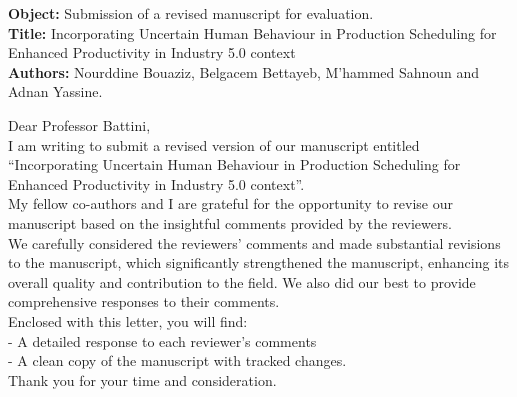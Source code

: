 \documentclass[a4,12pt]{article}
\begin{document}
	\begin{minipage}{\textwidth}
		\textbf{Object:} Submission of a revised manuscript for evaluation.\\
  \textbf{Title:} Incorporating Uncertain Human Behaviour in Production Scheduling for Enhanced Productivity in Industry 5.0 context\\
		\textbf{Authors:} Nourddine  Bouaziz, Belgacem Bettayeb, M'hammed Sahnoun and Adnan Yassine.
		\vspace{10mm} 
		
		Dear Professor Battini,\\
  
	I am writing to submit a revised version of our manuscript entitled “Incorporating Uncertain Human Behaviour in Production Scheduling for Enhanced Productivity in Industry 5.0 context”. \\
        
My fellow co-authors and I are grateful for the opportunity to revise our manuscript based on the insightful comments provided by the reviewers. \\
        
We carefully considered the reviewers' comments and made substantial revisions to the manuscript, which significantly strengthened the manuscript, enhancing its overall quality and contribution to the field.  We also did our best to provide comprehensive responses to their comments.\\

Enclosed with this letter, you will find:\\
- A detailed response to each reviewer's comments\\
- A clean copy of the manuscript with tracked changes.\\ 

Thank you for your time and consideration.\\
		
		
	\end{minipage}
	
	
\end{document}
